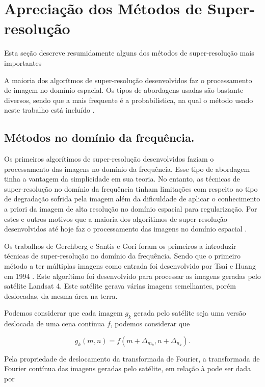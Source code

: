 \section{\label{sec:srmetodos}Apreciação dos Métodos de Super-resolução} 
Esta seção descreve resumidamente alguns dos métodos de super-resolução mais importantes 

A maioria dos algorítmos de super-resolução desenvolvidos faz o processamento de imagem no domínio espacial.
Os tipos de abordagens usadas são bastante diversos, sendo que a mais frequente é a probabilística, na qual o método usado neste trabalho está incluído \cite{nasrollahi2014super}.
\subsection{Métodos no domínio da frequência.}
Os primeiros algorítimos de super-resolução desenvolvidos faziam o processamento das imagens no domínio da frequência.
Esse tipo de abordagem tinha a vantagem da simplicidade em sua teoria.
No entanto, as técnicas de super-resolução no domínio da frequência tinham limitações com respeito ao tipo de degradação sofrida pela imagem além da dificuldade de aplicar o conhecimento a priori da imagem de alta resolução no domínio espacial para regularização.
Por estes e outros motivos que a maioria dos algorítimos de super-resolução desenvolvidos até hoje faz o processamento das imagens no domínio espacial \cite{park2003super}.

Os trabalhos de Gerchberg \cite{Gerchberg1974} e Santis e Gori \cite{de1975iterative} foram os primeiros a introduzir técnicas de super-resolução no domínio da frequência.
Sendo que o primeiro método a ter múltiplas imagens como entrada foi desenvolvido por Tsai e Huang em 1994 \cite{nasrollahi2014super}.
Este algorítimo foi desenvolvido para processar as imagens geradas pelo satélite Landsat 4.
Este satélite gerava várias imagens semelhantes, porém deslocadas, da mesma área na
terra.

Podemos considerar que cada imagem $g_k$ gerada pelo satélite seja uma versão deslocada de uma cena contínua $f$, podemos considerar que

\begin{equation}
	g_k(m,n) = f(m + \Delta_{m_k}, n + \Delta_{n_k}).
\end{equation}

Pela propriedade de deslocamento da transformada de Fourier, a transformada de Fourier contínua das imagens geradas pelo satélite, em relação à pode ser dada por

